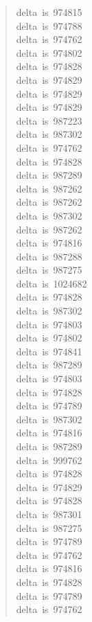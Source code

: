 \documentclass[letterpaper]{article}
\begin{document}
\begin{quote}
{delta~is~974815\\
delta~is~974788\\
delta~is~974762\\
delta~is~974802\\
delta~is~974828\\
delta~is~974829\\
delta~is~974829\\
delta~is~974829\\
delta~is~987223\\
delta~is~987302\\
delta~is~974762\\
delta~is~974828\\
delta~is~987289\\
delta~is~987262\\
delta~is~987262\\
delta~is~987302\\
delta~is~987262\\
delta~is~974816\\
delta~is~987288\\
delta~is~987275\\
delta~is~1024682\\
delta~is~974828\\
delta~is~987302\\
delta~is~974803\\
delta~is~974802\\
delta~is~974841\\
delta~is~987289\\
delta~is~974803\\
delta~is~974828\\
delta~is~974789\\
delta~is~987302\\
delta~is~974816\\
delta~is~987289\\
delta~is~999762\\
delta~is~974828\\
delta~is~974829\\
delta~is~974828\\
delta~is~987301\\
delta~is~987275\\
delta~is~974789\\
delta~is~974762\\
delta~is~974816\\
delta~is~974828\\
delta~is~974789\\
delta~is~974762\\
}
\end{quote}
\end{document}

